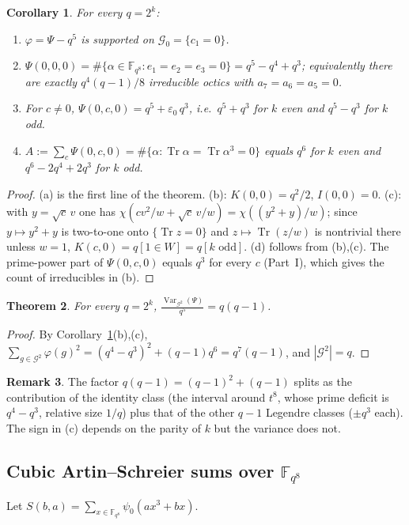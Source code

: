 \documentclass[11pt,a4paper]{amsart}
\newtheorem{theorem}{Theorem}[section]
\newtheorem{corollary}[theorem]{Corollary}
\theoremstyle{definition}
\newtheorem{remark}[theorem]{Remark}
\newcommand{\F}{\mathbb{F}}
\newcommand{\G}{\mathcal{G}}
\newcommand{\Tr}{\operatorname{Tr}}
\newcommand{\Var}{\operatorname{Var}}
\newcommand{\sgn}{\varepsilon_0}
\begin{document}
\begin{corollary}\label{cor:d4}
For every $q=2^k$:
\begin{enumerate}[label=\textup{(\alph*)},leftmargin=2em]
\item $\varphi=\Psi-q^5$ is supported on $\G_0=\{c_1=0\}$.
\item $\Psi(0,0,0)=\#\{\alpha\in\F_{q^8}:e_1=e_2=e_3=0\}=q^5-q^4+q^3$; equivalently there are exactly $q^4(q-1)/8$ irreducible octics with $a_7=a_6=a_5=0$.
\item For $c\ne0$, $\Psi(0,c,0)=q^5+\sgn\,q^3$, i.e.\ $q^5+q^3$ for $k$ even and $q^5-q^3$ for $k$ odd.
\item $A:=\sum_{c}\Psi(0,c,0)=\#\{\alpha:\Tr\alpha=\Tr\alpha^3=0\}$ equals $q^6$ for $k$ even and $q^6-2q^4+2q^3$ for $k$ odd.
\end{enumerate}
\end{corollary}
\begin{proof}
(a) is the first line of the theorem. (b): $K(0,0)=q^2/2$, $I(0,0)=0$. (c): with $y=\sqrt c\,v$ one has $\chi(cv^2/w+\sqrt c\,v/w)=\chi((y^2+y)/w)$; since $y\mapsto y^2+y$ is two-to-one onto $\{\Tr z=0\}$ and $z\mapsto\Tr(z/w)$ is nontrivial there unless $w=1$, $K(c,0)=q[1\in W]=q[k\text{ odd}]$. (d) follows from (b),(c). The prime-power part of $\Psi(0,c,0)$ equals $q^3$ for every $c$ (Part~I), which gives the count of irreducibles in (b).
\end{proof}

\begin{theorem}\label{thm:varH4}
For every $q=2^k$, $\displaystyle\frac{\Var_{\G^2}(\Psi)}{q^5}=q(q-1)$.
\end{theorem}
\begin{proof}
By Corollary~\ref{cor:d4}(b),(c), $\sum_{g\in\G^2}\varphi(g)^2=(q^4-q^3)^2+(q-1)q^6=q^7(q-1)$, and $|\G^2|=q$.
\end{proof}

\begin{remark}
The factor $q(q-1)=(q-1)^2+(q-1)$ splits as the contribution of the identity class (the interval around $t^8$, whose prime deficit is $q^4-q^3$, relative size $1/q$) plus that of the other $q-1$ Legendre classes ($\pm q^3$ each). The sign in (c) depends on the parity of $k$ but the variance does not.
\end{remark}

\subsection{Cubic Artin--Schreier sums over \texorpdfstring{$\F_{q^8}$}{F(q8)}}
Let $S(b,a)=\sum_{x\in\F_{q^8}}\psi_0(ax^3+bx)$.
\end{document}
